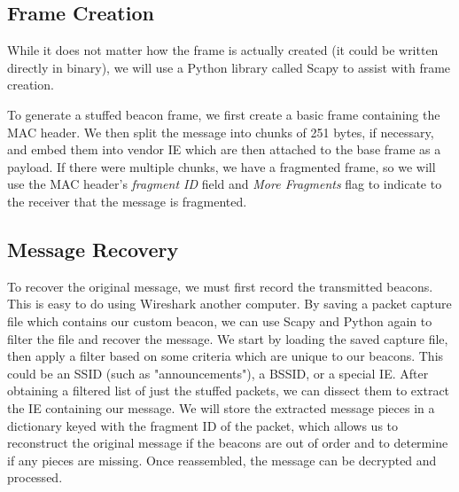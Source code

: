 \documentclass[letterpaper, 10 pt, conference]{ieeeconf}  %
\begin{document}
\subsection{Frame Creation}

While it does not matter how the frame is actually created (it could be written directly in binary), we will use a Python library called Scapy \cite{c4} to assist with frame creation.

To generate a stuffed beacon frame, we first create a basic frame containing the MAC header.  We then split the message into chunks of 251 bytes, if necessary, and embed them into vendor IE which are then attached to the base frame as a payload.  If there were multiple chunks, we have a fragmented frame, so we will use the MAC header's \textit{fragment ID} field and \textit{More Fragments} flag to indicate to the receiver that the message is fragmented.

\subsection{Message Recovery}

To recover the original message, we must first record the transmitted beacons.  This is easy to do using Wireshark \cite{c6} another computer.  By saving a packet capture file which contains our custom beacon, we can use Scapy and Python again to filter the file and recover the message.  We start by loading the saved capture file, then apply a filter based on some criteria which are unique to our beacons.  This could be an SSID (such as "announcements"), a BSSID, or a special IE.  After obtaining a filtered list of just the stuffed packets, we can dissect them to extract the IE containing our message.  We will store the extracted message pieces in a dictionary keyed with the fragment ID of the packet, which allows us to reconstruct the original message if the beacons are out of order and to determine if any pieces are missing.  Once reassembled, the message can be decrypted and processed.


\addtolength{\textheight}{-9.5cm}   %
\end{document}
